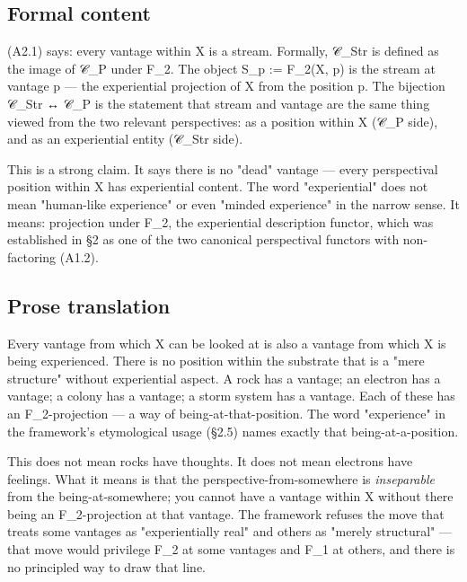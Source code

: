 \documentclass[11pt, openany]{book}
\begin{document}
\subsection{Formal content}

(A2.1) says: every vantage within X is a stream. Formally, 𝒞\_\allowbreak{}Str is defined as the image of 𝒞\_\allowbreak{}P under F\_\allowbreak{}2. The object S\_\allowbreak{}p := F\_\allowbreak{}2(X, p) is the stream at vantage p --- the experiential projection of X from the position p. The bijection 𝒞\_\allowbreak{}Str ↔ 𝒞\_\allowbreak{}P is the statement that stream and vantage are the same thing viewed from the two relevant perspectives: as a position within X (𝒞\_\allowbreak{}P side), and as an experiential entity (𝒞\_\allowbreak{}Str side).

This is a strong claim. It says there is no "dead" vantage --- every perspectival position within X has experiential content. The word "experiential" does not mean "human-like experience" or even "minded experience" in the narrow sense. It means: projection under F\_\allowbreak{}2, the experiential description functor, which was established in §2 as one of the two canonical perspectival functors with non-factoring (A1.2).

\subsection{Prose translation}

Every vantage from which X can be looked at is also a vantage from which X is being experienced. There is no position within the substrate that is a "mere structure" without experiential aspect. A rock has a vantage; an electron has a vantage; a colony has a vantage; a storm system has a vantage. Each of these has an F\_\allowbreak{}2-projection --- a way of being-at-that-position. The word "experience" in the framework's etymological usage (§2.5) names exactly that being-at-a-position.

This does not mean rocks have thoughts. It does not mean electrons have feelings. What it means is that the perspective-from-somewhere is \textit{inseparable} from the being-at-somewhere; you cannot have a vantage within X without there being an F\_\allowbreak{}2-projection at that vantage. The framework refuses the move that treats some vantages as "experientially real" and others as "merely structural" --- that move would privilege F\_\allowbreak{}2 at some vantages and F\_\allowbreak{}1 at others, and there is no principled way to draw that line.
\end{document}
